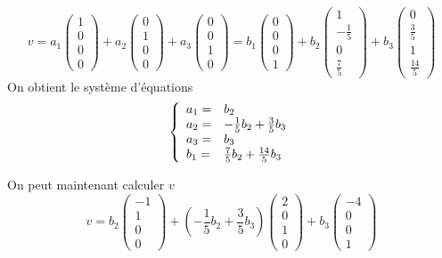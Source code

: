 \documentclass[]{book}
\theoremstyle{definition}
\begin{document}
$$
v= 
a_1\begin{pmatrix}1\\0\\0\\0\end{pmatrix}+a_2\begin{pmatrix}0\\1\\0\\0\end{pmatrix}+a_3\begin{pmatrix}0\\0\\1\\0\end{pmatrix}
= b_1\begin{pmatrix}0\\0\\0\\1\end{pmatrix}+b_2\begin{pmatrix}1\\-\frac{1}{5}\\0\\\frac{7}{5}\end{pmatrix}+b_3\begin{pmatrix}0\\\frac{3}{5}\\1\\\frac{14}{5}\end{pmatrix}
$$
On obtient le syst\`eme d'\'equations
$$
\left\{ 
\begin{array}{l l}
a_1 =  & b_2\\
a_2 = & -\frac{1}{5}b_2+\frac{3}{5}b_3\\
a_3 = & b_3\\
b_1 = & \frac{7}{5}b_2 + \frac{14}{5}b_3\\
\end{array}
\right. 
$$ 

On peut maintenant calculer $v$
$$
v= 
b_2\begin{pmatrix}-1\\1\\0\\0\end{pmatrix}+(-\frac{1}{5}b_2+\frac{3}{5}b_3)\begin{pmatrix}2\\0\\1\\0\end{pmatrix}+b_3\begin{pmatrix}-4\\0\\0\\1\end{pmatrix}
$$
\end{document}
